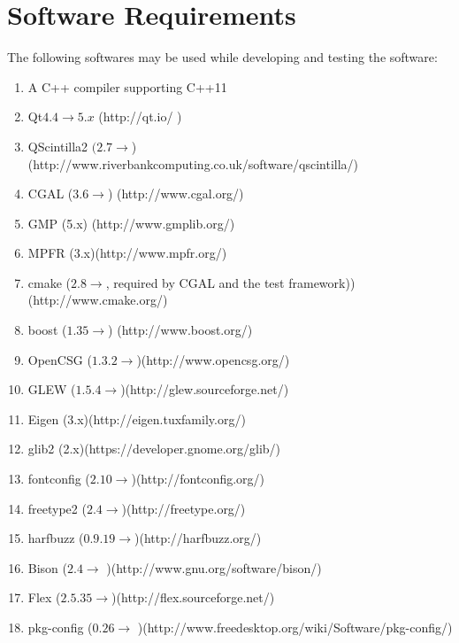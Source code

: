 \documentclass[12pt]{report}
\begin{document}
\section{Software Requirements}
The following softwares may be used while developing and testing the software:
\begin{enumerate} 
	\item A C++ compiler supporting C++11
	
	\item Qt$  4.4 \rightarrow 5.x $ (http://qt.io/ )
	
	\item QScintilla2 $ (2.7 \rightarrow $)(http://www.riverbankcomputing.co.uk/software/qscintilla/)
	
	\item CGAL ($ 3.6 \rightarrow $) (http://www.cgal.org/)
	
	\item GMP (5.x) (http://www.gmplib.org/)
	
	\item MPFR (3.x)(http://www.mpfr.org/)
	
	\item cmake ($ 2.8 \rightarrow $, required by CGAL and the test framework))(http://www.cmake.org/)
	
	\item boost ($ 1.35 \rightarrow $) (http://www.boost.org/)
	
	\item OpenCSG ($ 1.3.2 \rightarrow $)(http://www.opencsg.org/)
	
	\item GLEW ($ 1.5.4 \rightarrow $)(http://glew.sourceforge.net/)
	
	\item Eigen (3.x)(http://eigen.tuxfamily.org/)
	
	\item glib2 (2.x)(https://developer.gnome.org/glib/)
	
	\item fontconfig ($ 2.10 \rightarrow  $)(http://fontconfig.org/)
	
	\item freetype2 ($ 2.4 \rightarrow  $)(http://freetype.org/)
	
	\item harfbuzz ($ 0.9.19 \rightarrow  $)(http://harfbuzz.org/)
	
	\item Bison ($ 2.4 \rightarrow $ )(http://www.gnu.org/software/bison/)
	
	\item Flex ($ 2.5.35 \rightarrow  $)(http://flex.sourceforge.net/)
	
	\item pkg-config ($ 0.26 \rightarrow $ )(http://www.freedesktop.org/wiki/Software/pkg-config/)
	
\end{enumerate}
\end{document}
